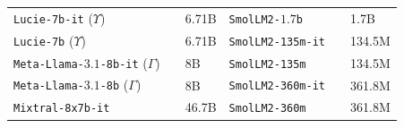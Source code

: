 \begin{tabular}{llllll}
\texttt{Lucie-7b-it} ($\Upsilon$) & \citet{openllm2025lucie} & 6.71B & \texttt{SmolLM2-$1.7$b} & \citet{allal2025smollm2smolgoesbig} & 1.7B \\
\texttt{Lucie-7b} ($\Upsilon$) & \citet{openllm2025lucie} & 6.71B & \texttt{SmolLM2-135m-it} & \citet{allal2025smollm2smolgoesbig} & 134.5M \\
\texttt{Meta-Llama-$3.1$-8b-it} ($\Gamma$) & \citet{grattafiori2024llama} & 8B & \texttt{SmolLM2-135m} & \citet{allal2025smollm2smolgoesbig} & 134.5M \\
\texttt{Meta-Llama-$3.1$-8b} ($\Gamma$) & \citet{grattafiori2024llama} & 8B & \texttt{SmolLM2-360m-it} & \citet{allal2025smollm2smolgoesbig} & 361.8M \\
\texttt{Mixtral-8x7b-it} & \citet{rastogi2025magistral} & 46.7B & \texttt{SmolLM2-360m} & \citet{allal2025smollm2smolgoesbig} & 361.8M \\
\bottomrule
\end{tabular}
